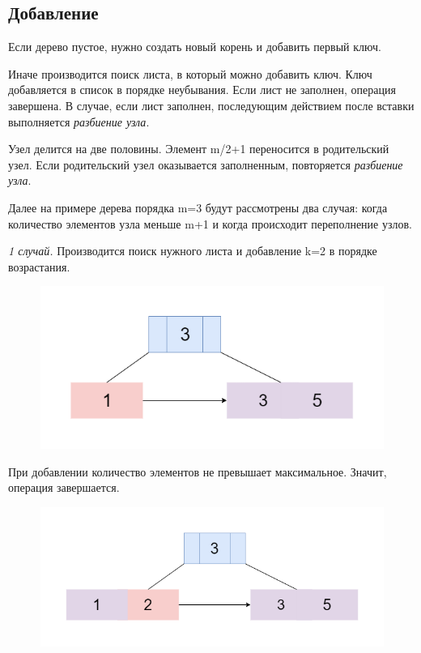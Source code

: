\documentclass{article}
\begin{document}
\subsection{Добавление}
Если дерево пустое, нужно создать новый корень и добавить первый ключ.

 Иначе производится поиск листа, в который можно добавить ключ. Ключ добавляется в список в порядке неубывания. Если лист не заполнен, операция завершена. В случае, если лист заполнен, последующим действием после вставки выполняется \textit{разбиение узла}.

Узел делится на две половины. Элемент m/2+1 переносится в родительский узел. Если родительский узел оказывается заполненным, повторяется \textit{разбиение узла}.

Далее на примере дерева порядка m=3 будут рассмотрены два случая: когда количество элементов узла меньше m+1 и когда происходит переполнение узлов.


\textit{1 случай.} Производится поиск нужного листа и добавление k=2 в порядке возрастания.
\begin{figure}
\includegraphics[scale=0.4]{binsert11.png}

\caption{}
\end{figure}


При добавлении количество элементов не превышает максимальное. Значит, операция завершается.
\begin{figure}
\includegraphics[scale=0.4]{binsert2.png}

\caption{}
\end{figure}
\end{document}
